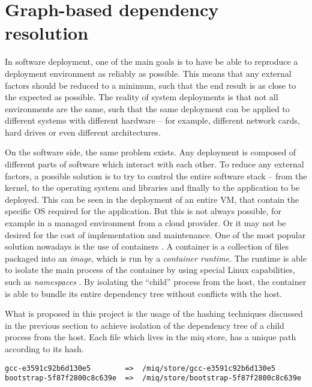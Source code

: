 \FloatBarrier
\section{Graph-based dependency resolution}

In software deployment, one of the main goals is to have be
able to reproduce a deployment environment as reliably as
possible. This means that any external factors should be
reduced to a minimum, such that the end result is as close
to the expected as possible. The reality of system
deployments is that not all environments are the same, such
that the same deployment can be applied to different systems
with different hardware -- for example, different network
cards, hard drives or even different architectures.

On the software side, the same problem exists. Any
deployment is composed of different parts of software which
interact with each other. To reduce any external factors,
a possible solution is to try to control the entire software
stack -- from the kernel, to the operating system and
libraries and finally to the application to be deployed.
This can be seen in the deployment of an entire \ac{VM}, that
contain the specific OS required for the application. But
this is not always possible, for example in a managed
environment from a cloud provider. Or it may not be desired
for the cost of implementation and maintenance. One of the
most popular solution nowadays is the use of containers
\cite{DockerAcceleratedContainerized2022}. A container is a
collection of files packaged into an \textit{image}, which is
run by a \textit{container runtime}. The runtime is able to
isolate the main process of the container by using special
Linux capabilities, such as \textit{namespaces}
\cite{NamespacesLinuxManualb}. By isolating the ``child''
process from the host, the container is able to bundle its
entire dependency tree without conflicts with the host.

What is proposed in this project is the usage of the hashing
techniques discussed in the previous section to achieve
isolation of the dependency tree of a child process from the
host. Each file which lives in the miq store, has a unique
path according to its hash.

\begin{verbatim}
gcc-e3591c92b6d130e5        =>  /miq/store/gcc-e3591c92b6d130e5
bootstrap-5f87f2800c8c639e  =>  /miq/store/bootstrap-5f87f2800c8c639e
\end{verbatim}

